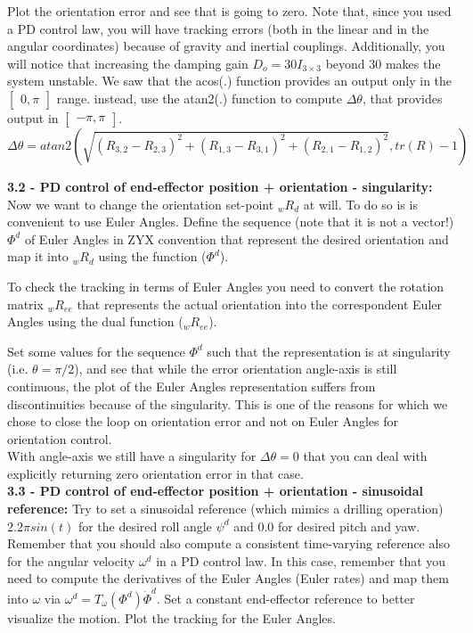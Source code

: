 \documentclass[11pt]{article}
\newcommand{\mat}[1]{\ensuremath{\begin{bmatrix}#1\end{bmatrix}}}	%
\begin{document}
Plot   the  orientation error and see that is going to zero.
 Note that, since you used a PD control law,  you will have tracking errors (both in the linear and in the angular  coordinates) because of gravity and inertial couplings. Additionally, you will notice that increasing the damping gain  $D_o = 30I_{3\times3}$ beyond 30 makes the system unstable.
We saw that the acos(.) function provides an output only in the $\mat{ 0 , \pi}$ range. 
instead, use the atan2(.) function to compute  $\Delta \theta$, that provides output in $\mat{ -\pi   , \pi }$.\\

\begin{equation}
\Delta \theta = atan2\left(\sqrt{(R_{3,2} - R_{2,3})^2 + (R_{1,3} - R_{3,1})^2 + (R_{2,1} - R_{1,2})^2}, tr(R) -1\right)
\end{equation}






\textbf{3.2 - PD control of end-effector position + orientation - singularity:}
Now we want to change the orientation set-point  ${}_wR_{d}$ at will. To do so 
is is convenient to use Euler Angles. Define the sequence (note that it is not a vector!)  
$\Phi^d$ of Euler Angles in ZYX convention that represent the desired orientation 
and map it into ${}_wR_{d}$ using the function  ($\Phi^d$). 

To check the tracking in terms of Euler Angles you need to convert the rotation matrix ${}_wR_{ee}$ 
that represents the actual orientation  into the correspondent Euler Angles using the dual function (${}_wR_{ee}$).

Set some values for the sequence $\Phi^d$ such that the representation is at singularity (i.e. $\theta = \pi/2$), 
and see that while the error orientation angle-axis is still continuous, the 
plot of the Euler Angles representation suffers from discontinuities because of the singularity. 
This is one of the reasons for which we chose to close the loop on orientation error and not on Euler Angles for orientation control. \\
With angle-axis we still have a singularity for $\Delta \theta = 0$ that you can deal with explicitly returning zero orientation error in that case.\\



 

\textbf{3.3 - PD control of end-effector position + orientation - sinusoidal reference:}
Try to set a sinusoidal reference (which mimics a drilling operation)  $ 2.2 \pi sin(t)$ for the desired roll angle $\psi^d$ and 0.0 for desired pitch and yaw. Remember that you should also compute a consistent time-varying reference also for the angular velocity $\omega^{d}$ in a PD control law. In this case, remember that you need to compute the derivatives of the Euler Angles (Euler rates) and map  them into $\omega$ via  $\omega^d = T_{\omega}(\Phi^d)\dot{\Phi}^d$. Set a constant end-effector reference to better visualize the motion.
Plot the tracking for the Euler Angles.\\
\end{document}
